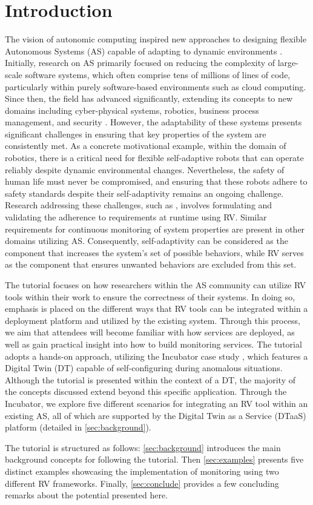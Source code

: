 \section{Introduction}

The vision of autonomic computing inspired new approaches to designing flexible Autonomous Systems (AS) capable of adapting to dynamic environments \cite{kephartVisionAutonomicComputing2003}.
Initially, research on AS primarily focused on reducing the complexity of large-scale software systems, which often comprise tens of millions of lines of code, particularly within purely software-based environments such as cloud computing.
Since then, the field has advanced significantly, extending its concepts to new domains including cyber-physical systems, robotics, business process management, and security .
However, the adaptability of these systems presents significant challenges in ensuring that key properties of the system are consistently met.
As a concrete motivational example, within the domain of robotics, there is a critical need for flexible self-adaptive robots that can operate reliably despite dynamic environmental changes.
Nevertheless, the safety of human life must never be compromised, and ensuring that these robots adhere to safety standards despite their self-adaptivity remains an ongoing challenge.
Research addressing these challenges, such as , involves formulating and validating the adherence to requirements at runtime using RV.
Similar requirements for continuous monitoring of system properties are present in other domains utilizing AS.
Consequently, self-adaptivity can be considered as the component that increases the system's set of possible behaviors, while RV serves as the component that ensures unwanted behaviors are excluded from this set.

The tutorial focuses on how researchers within the AS community can utilize RV tools within their work to ensure the correctness of their systems.
In doing so, emphasis is placed on the different ways that RV tools can be integrated within a deployment platform and utilized by the existing system.
Through this process, we aim that attendees will become familiar with how services are deployed, as well as gain practical insight into how to build monitoring services.
The tutorial adopts a hands-on approach, utilizing the Incubator case study \cite{Feng2021, Feng2022}, which features a Digital Twin (DT) capable of self-configuring during anomalous situations.
Although the tutorial is presented within the context of a DT, the majority of the concepts discussed extend beyond this specific application.
Through the Incubator, we explore five different scenarios for integrating an RV tool within an existing AS, all of which are supported by the Digital Twin as a Service (DTaaS) platform (detailed in \cref{sec:background}).

The tutorial is structured as follows: \cref{sec:background} introduces the main background concepts for following the tutorial.
Then \cref{sec:examples} presents five distinct examples showcasing the implementation of monitoring using two different RV frameworks.
Finally, \cref{sec:conclude} provides a few concluding remarks about the potential presented here.
